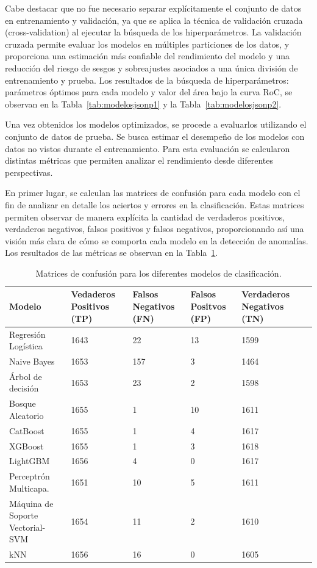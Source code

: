 \documentclass[11pt,a4paper,spanish]{book}
\numberwithin{equation}{chapter}
\numberwithin{figure}{chapter}
\begin{document}
Cabe destacar que no fue necesario separar explícitamente el conjunto de datos en 
entrenamiento y validación, ya que se aplica la técnica de validación cruzada 
(cross-validation) al ejecutar la búsqueda de los hiperparámetros. La validación 
cruzada permite evaluar los modelos en múltiples particiones de los datos, y 
proporciona una estimación más confiable del rendimiento del modelo y una reducción 
del riesgo de sesgos y sobreajustes asociados a una única división de entrenamiento y 
prueba. Los resultados de la búsqueda de hiperparámetros: parámetros óptimos para cada 
modelo y valor del área bajo la curva RoC, se observan en la 
Tabla~\ref{tab:modelosjsonp1}  y la Tabla~\ref{tab:modelosjsonp2}.  



Una vez obtenidos los modelos optimizados, se procede a evaluarlos utilizando el conjunto 
de datos de prueba. Se busca estimar el desempeño de los modelos con datos 
no vistos durante el entrenamiento. Para esta evaluación se calcularon distintas 
métricas que permiten analizar el rendimiento desde diferentes perspectivas. 


En primer lugar, se calculan las matrices de confusión para cada modelo 
con el fin de analizar en detalle los aciertos y errores en la clasificación. 
Estas matrices permiten observar de manera explícita la cantidad de verdaderos positivos, 
verdaderos negativos, falsos positivos y falsos negativos, 
proporcionando así una visión más clara de cómo se comporta cada modelo en la detección 
de anomalías. Los resultados de las métricas se observan en  la Tabla~\ref{tab:matrixconff}. 


\begin{table}[H]
\caption{Matrices de confusión para los diferentes modelos de clasificación.}
\centering
\renewcommand{\arraystretch}{1.2}
\footnotesize
\begin{tabularx}{\textwidth}{|l|X|X|X|X|X|}
    \hline
    \textbf{Modelo} & 
    \textbf{Vedaderos Positivos (TP)} & 
    \textbf{Falsos Negativos (FN)} & 
    \textbf{Falsos Positvos (FP)} & 
    \textbf{Verdaderos Negativos (TN)} \\
    \hline
    Regresión Logística & 1643 & 22 & 13 & 1599 \\
    \hline
    Naive Bayes & 1653 & 157 & 3 & 1464 \\
    \hline
    Árbol de decisión & 1653 & 23 & 2 & 1598 \\
    \hline
    Bosque Aleatorio & 1655 & 1 & 10 & 1611 \\
    \hline
    CatBoost & 1655 & 1 & 4 & 1617 \\
    \hline
    XGBoost & 1655 & 1 & 3 & 1618 \\
    \hline
     LightGBM & 1656 & 4 & 0 & 1617 \\
    \hline
    Perceptrón Multicapa. & 1651 & 10 & 5 & 1611 \\
    \hline
    Máquina de Soporte Vectorial-SVM & 1654 & 11 & 2 & 1610 \\
    \hline
    kNN & 1656 & 16 & 0 & 1605 \\
    \hline
\end{tabularx}
\label{tab:matrixconff}
\end{table}
\end{document}
